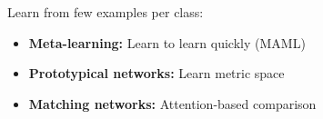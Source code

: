 Learn from few examples per class:
\begin{itemize}
    \item \textbf{Meta-learning:} Learn to learn quickly (MAML)
    \item \textbf{Prototypical networks:} Learn metric space
    \item \textbf{Matching networks:} Attention-based comparison
\end{itemize}






